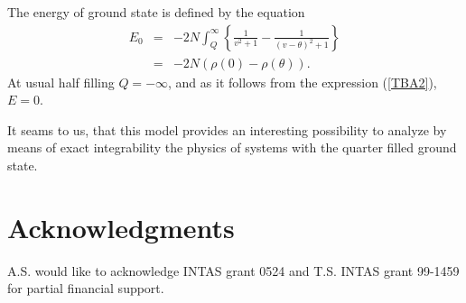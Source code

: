 \documentclass[a4paper,12pt]{article}
\newcommand{\nn}{\nonumber}
\begin{document}
The energy of ground state is defined by the equation
\begin{eqnarray}
\label{TBA2}
E_0&=&-2N \int_Q^{\infty}\left\{\frac{1}{v^2 +1}-
\frac{1}{(v-\theta)^2 +1}\right\}\nn\\
&=&-2N (\rho(0)-\rho(\theta)).
\end{eqnarray}
At usual half filling $Q=-\infty$, and as it follows from the
expression (\ref{TBA2}), $E=0$.

It seams to us, that this model provides an interesting possibility
to analyze by means of exact integrability the physics of systems
with the quarter filled ground state.

\section{Acknowledgments}
A.S. would like to acknowledge INTAS grant 0524 and T.S. INTAS grant
99-1459 for partial financial support.  
\end{document}
